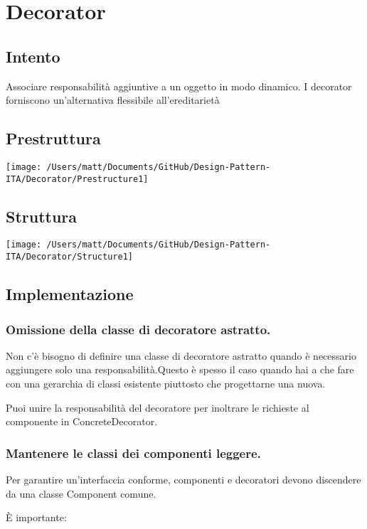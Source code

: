 \chapter{Decorator}
\section{Intento}

Associare responsabilità aggiuntive a un oggetto in modo dinamico. I decorator forniscono un'alternativa flessibile all'ereditarietà


\section{Prestruttura}

\texttt{[image: /Users/matt/Documents/GitHub/Design-Pattern-ITA/Decorator/Prestructure1]}


\section{Struttura}

\texttt{[image: /Users/matt/Documents/GitHub/Design-Pattern-ITA/Decorator/Structure1]}


\section{Implementazione}

\subsection{Omissione della classe di decoratore astratto.}
Non c'è bisogno di definire una classe di decoratore astratto quando è necessario aggiungere solo una responsabilità.Questo è spesso il caso quando hai a che fare con una gerarchia di classi esistente piuttosto che progettarne una nuova.

Puoi unire la responsabilità del decoratore per inoltrare le richieste al componente in ConcreteDecorator.

\subsection{Mantenere le classi dei componenti leggere.}
Per garantire un'interfaccia conforme, componenti e decoratori devono discendere da una classe Component comune.

È importante:

